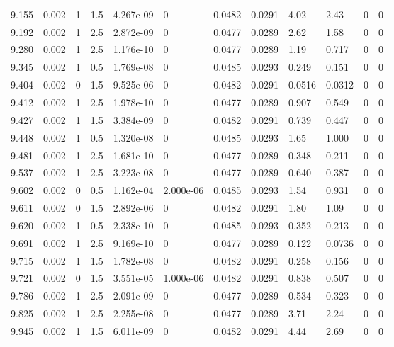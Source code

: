 \documentclass[preview]{standalone}
\begin{document}
{{{{{{{\begin{tabular}{L{1.2cm}C{1.2cm} C{0.3cm}C{0.5cm} C{1.4cm}C{1.4cm} C{1.4cm}C{1.4cm} C{1.6cm}C{1.6cm} C{1.6cm}C{1.6cm}}
  9.155  &  0.002  & 1     & 1.5 &  4.267e-09  & 0  &  0.0482&   0.0291& 4.02 & 2.43   &  0 & 0  \\ 
  9.192  &  0.002  & 1     & 2.5 &  2.872e-09  & 0  &  0.0477&   0.0289& 2.62 & 1.58   &  0 & 0  \\ 
  9.280  &  0.002  & 1     & 2.5 &  1.176e-10  & 0  &  0.0477&   0.0289& 1.19 & 0.717   &  0 & 0  \\ 
  9.345  &  0.002  & 1     & 0.5 &  1.769e-08  & 0  &  0.0485&   0.0293& 0.249 & 0.151   &  0 & 0  \\ 
  9.404  &  0.002  & 0     & 1.5 &  9.525e-06  & 0  &  0.0482&   0.0291& 0.0516 & 0.0312   &  0 & 0  \\ 
  9.412  &  0.002  & 1     & 2.5 &  1.978e-10  & 0  &  0.0477&   0.0289& 0.907 & 0.549   &  0 & 0  \\ 
  9.427  &  0.002  & 1     & 1.5 &  3.384e-09  & 0  &  0.0482&   0.0291& 0.739 & 0.447   &  0 & 0  \\ 
  9.448  &  0.002  & 1     & 0.5 &  1.320e-08  & 0  &  0.0485&   0.0293& 1.65 & 1.000   &  0 & 0  \\ 
  9.481  &  0.002  & 1     & 2.5 &  1.681e-10  & 0  &  0.0477&   0.0289& 0.348 & 0.211   &  0 & 0  \\ 
  9.537  &  0.002  & 1     & 2.5 &  3.223e-08  & 0  &  0.0477&   0.0289& 0.640 & 0.387   &  0 & 0  \\ 
  9.602  &  0.002  & 0     & 0.5 &  1.162e-04  & 2.000e-06  &  0.0485&   0.0293& 1.54 & 0.931   &  0 & 0  \\ 
  9.611  &  0.002  & 0     & 1.5 &  2.892e-06  & 0  &  0.0482&   0.0291& 1.80 & 1.09   &  0 & 0  \\ 
  9.620  &  0.002  & 1     & 0.5 &  2.338e-10  & 0  &  0.0485&   0.0293& 0.352 & 0.213   &  0 & 0  \\ 
  9.691  &  0.002  & 1     & 2.5 &  9.169e-10  & 0  &  0.0477&   0.0289& 0.122 & 0.0736   &  0 & 0  \\ 
  9.715  &  0.002  & 1     & 1.5 &  1.782e-08  & 0  &  0.0482&   0.0291& 0.258 & 0.156   &  0 & 0  \\ 
  9.721  &  0.002  & 0     & 1.5 &  3.551e-05  & 1.000e-06  &  0.0482&   0.0291& 0.838 & 0.507   &  0 & 0  \\ 
  9.786  &  0.002  & 1     & 2.5 &  2.091e-09  & 0  &  0.0477&   0.0289& 0.534 & 0.323   &  0 & 0  \\ 
  9.825  &  0.002  & 1     & 2.5 &  2.255e-08  & 0  &  0.0477&   0.0289& 3.71 & 2.24   &  0 & 0  \\ 
  9.945  &  0.002  & 1     & 1.5 &  6.011e-09  & 0  &  0.0482&   0.0291& 4.44 & 2.69   &  0 & 0  \\ 

\end{tabular}}}}}}}}
\end{document}
